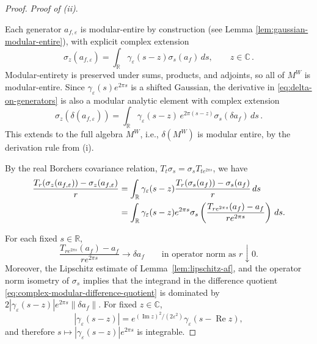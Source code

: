 \documentclass[11pt,a4paper]{article}
\theoremstyle{plain}
\numberwithin{theorem}{section}
\theoremstyle{definition}
\newcommand{\?}{\overset{?}{=}}
\renewcommand{\Re}{\operatorname{Re}}
\renewcommand{\Im}{\operatorname{Im}}
\begin{document}
\begin{proof}
\emph{Proof of (ii)}. 

Each generator $a_{f,\varepsilon}$ is modular-entire by construction (see Lemma \ref{lem:gaussian-modular-entire}), with explicit complex extension
\begin{equation*}
  \sigma_z(a_{f,\varepsilon})
  =\int_{\mathbb R}\gamma_\varepsilon(s-z)\sigma_s(a_f)\,ds,\qquad z\in\mathbb C\,.
\end{equation*}
Modular-entirety is preserved under sums, products, and adjoints, so all of $M^W$ is modular-entire.  
Since $\gamma_\varepsilon(s)e^{2\pi s}$ is a shifted Gaussian, the derivative in  \eqref{eq:delta-on-generators} is also a modular analytic element with complex extension
\begin{equation}\label{eq:sigmaz-afe}
    \sigma_z(\delta(a_{f,\varepsilon}))=\int_{\mathbb R}\gamma_\varepsilon(s-z)\,e^{2\pi( s-z)}\sigma_s(\delta a_f)\,ds\,.
\end{equation}
This extends to the full algebra $M^W$, i.e., $\delta(M^W)$ is modular entire,  by the derivation rule from (i).

By the real Borchers
covariance relation, $T_t\sigma_s=\sigma_sT_{te^{2\pi s}}$,
we have 
\begin{align}
 \frac{T_r(\sigma_z(a_{f,\varepsilon}))
             -\sigma_z(a_{f,\varepsilon})}{r}
 &=
 \int_{\mathbb R}
   \gamma_\varepsilon(s-z)
   \frac{T_r(\sigma_s(a_f))-\sigma_s(a_f)}{r}\,ds
 \notag\\
 &=
 \int_{\mathbb R}
   \gamma_\varepsilon(s-z)e^{2\pi s}
   \sigma_s\left(
      \frac{T_{re^{2\pi s}}(a_f)-a_f}
           {re^{2\pi s}}
   \right)\,ds.
 \label{eq:complex-modular-difference-quotient}
\end{align}

For each fixed \(s\in\mathbb R\),
\[
 \frac{T_{re^{2\pi s}}(a_f)-a_f}{re^{2\pi s}}
 \longrightarrow \delta a_f
 \qquad\text{in operator norm as }r\downarrow0.
\]
Moreover, the Lipschitz estimate of
Lemma~\ref{lem:lipschitz-af}, and the operator norm isometry of $\sigma_s$ implies that the integrand in the difference quotient \eqref{eq:complex-modular-difference-quotient} is dominated by $2|\gamma_{\varepsilon}(s-z)| e^{2\pi s}\|\delta a_f\|$.
For fixed \(z\in\mathbb C\),
\[
 |\gamma_\varepsilon(s-z)|
 =
 e^{(\Im z)^2/(2\varepsilon^2)}
 \gamma_\varepsilon(s-\Re z),
\]
and therefore
\(
 s\longmapsto
 |\gamma_\varepsilon(s-z)|e^{2\pi s}
\)
is integrable.



\end{proof}
\end{document}

